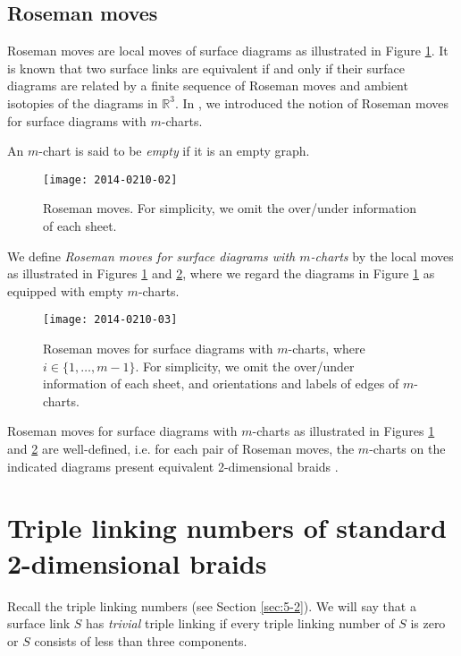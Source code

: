 \documentclass[a4paper,11pt]{amsart}
\numberwithin{equation}{section}
\begin{document}
\subsection{Roseman moves}
Roseman moves are local moves of surface diagrams as illustrated in Figure \ref{fig:0417-03}. 
It is known \cite{Roseman} that two surface links are equivalent if and only if their surface diagrams are related by a finite sequence of Roseman moves and ambient isotopies of the diagrams in $\mathbb{R}^3$.
In \cite{N4}, we introduced the notion of Roseman moves for surface diagrams with $m$-charts. 

An $m$-chart is said to be {\it empty} if it is an empty graph. 
\begin{figure}
\centering
\texttt{[image: 2014-0210-02]}
\caption{Roseman moves. For simplicity, we omit the over/under information of each sheet. }
\label{fig:0417-03}
 \end{figure}
\begin{definition}
We define {\it Roseman moves for surface diagrams with $m$-charts} by the local moves as illustrated in Figures \ref{fig:0417-03} and \ref{fig:0417-04}, where we regard the diagrams in Figure \ref{fig:0417-03} as equipped with empty $m$-charts. 
\end{definition}

\begin{figure}
 \texttt{[image: 2014-0210-03]}
\caption{Roseman moves for surface diagrams with $m$-charts, where $i \in \{1,\ldots,m-1\}$. For simplicity, we omit the over/under information of each sheet, and orientations and labels of edges of $m$-charts. }
\label{fig:0417-04}
 \end{figure} 
Roseman moves for surface diagrams with $m$-charts as illustrated in Figures \ref{fig:0417-03} and \ref{fig:0417-04} are well-defined, i.e. for each pair of Roseman moves, the $m$-charts on the indicated diagrams present equivalent 2-dimensional braids \cite[Theorem 6.2]{N4}. 
  

\section{Triple linking numbers of standard 2-dimensional braids}\label{sec:4}

Recall the triple linking numbers (see Section \ref{sec:5-2}). 
We will say that a surface link $S$ has {\it trivial} triple linking if every triple linking number of $S$ is zero or $S$ consists of less than three components. 
\end{document}
